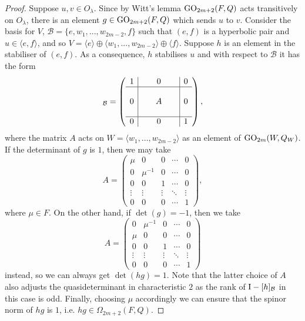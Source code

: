 \begin{proof}
    Suppose $u, v \in O_{\lambda}$. Since by Witt's lemma $\mathrm{GO}_{2m+2}(F,Q)$
    acts transitively on $O_{\lambda}$, there is an element 
    $g \in \mathrm{GO}_{2m+2}(F,Q)$ which sends $u$ to $v$. Consider the basis 
    for $V$, $\mathcal{B} = \{e, w_1, ..., w_{2m-2}, f\}$ such that 
    $(e,f)$ is a hyperbolic pair and $u \in \langle e, f \rangle$, and so
    $V = \langle e \rangle \oplus \langle w_1, ..., w_{2m-2} \rangle
    \oplus \langle f \rangle$. Suppose $h$ is an element in the stabiliser of $(e,f)$.
    As a consequence, $h$ stabilises $u$ and with respect to $\mathcal{B}$ it has 
    the form
    \begin{equation*}
	[h]_{\mathcal{B}} = \left(
	    \begin{array}{c|c|c}
		1 & 0 & 0 \\ \hline 
		 & & \\
		0 &\ \ \ \ \ A\ \ \ \ \  & 0 \\ 
		 & & \\ \hline 
		0 & 0 & 1
	    \end{array}
	\right),
    \end{equation*}
    where the matrix $A$ acts on \mbox{$W=\langle w_1, ..., w_{2m-2} \rangle$} as an
     element of $\mathrm{GO}_{2m}(W,Q_W)$. If the determinant of $g$ is $1$,
    then we may take
    \begin{equation*}
	A = \begin{pmatrix}
	    \mu & 0 & 0 & \cdots & 0 \\
	    0 & \mu^{-1} & 0 & \cdots & 0 \\
	    0 & 0 & 1 & \cdots & 0 \\
	    \vdots & \vdots & \vdots & \ddots & \vdots \\
	    0 & 0 & 0 & \cdots & 1
	\end{pmatrix},
    \end{equation*}
    where $\mu \in F$. On the other hand, if $\det(g) = -1$, then we take		
    \begin{equation*}
	A = \begin{pmatrix}
	    0 & \mu^{-1} & 0 & \cdots & 0 \\
	    \mu & 0 & 0 & \cdots & 0 \\
	    0 & 0 & 1 & \cdots & 0 \\
	    \vdots & \vdots & \vdots & \ddots & \vdots \\
	    0 & 0 & 0 & \cdots & 1
	\end{pmatrix}
    \end{equation*}	
    instead, so we can always get $\det(hg) = 1$. Note that the latter choice of 
    $A$ also adjusts the quasideterminant in characteristic $2$ as the 
    rank of $\mathord{\mathrm{I}}-[h]_{\mathcal{B}}$ in this case is odd. 
    Finally, choosing $\mu$ accordingly 
    we can ensure that the spinor norm of $hg$ is $1$, i.e. $hg \in \Omega_{2m+2}(F,Q)$. 
\end{proof}

